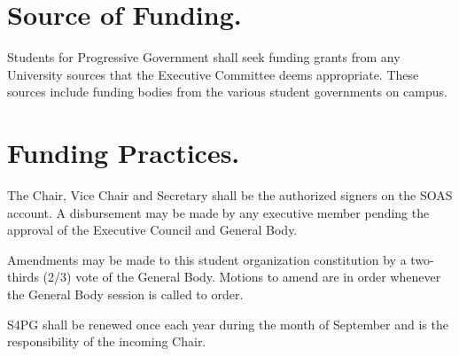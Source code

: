 \documentclass[12pt,letterpaper]{constitution}
\begin{document}
\section{Source of Funding.}
Students for Progressive Government shall seek funding grants from any University sources that the Executive Committee deems appropriate.  These sources include funding bodies from the various student governments on campus.

\section{Funding Practices.}
The Chair, Vice Chair and Secretary shall be the authorized signers on the SOAS account.  A disbursement may be made by any executive member pending the approval of the Executive Council and General Body.


Amendments may be made to this student organization constitution by a two-thirds (2/3) vote of the General Body.  Motions to amend are in order whenever the General Body session is called to order.


S4PG shall be renewed once each year during the month of September and is the responsibility of the incoming Chair.
\end{document}
